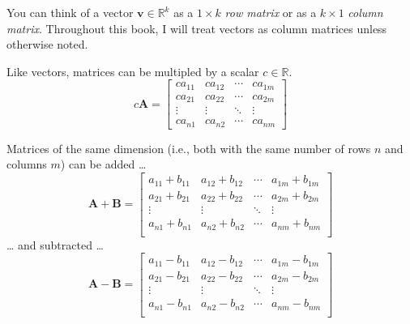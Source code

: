 \documentclass[12pt,oneside,openany]{book}
\begin{document}
You can think of a vector \(\mathbf{v} \in \mathbb{R}^k\) as a
\(1 \times k\) \emph{row matrix} or as a \(k \times 1\) \emph{column
matrix}. Throughout this book, I will treat vectors as column matrices
unless otherwise noted.

Like vectors, matrices can be multipled by a scalar
\(c \in \mathbb{R}\). \[
c \mathbf{A} =
\begin{bmatrix}
  c a_{11} & c a_{12} & \cdots & c a_{1m} \\
  c a_{21} & c a_{22} & \cdots & c a_{2m} \\
  \vdots & \vdots & \ddots & \vdots \\
  c a_{n1} & c a_{n2} & \cdots & c a_{nm}
\end{bmatrix}
\]

Matrices of the same dimension (i.e., both with the same number of rows
\(n\) and columns \(m\)) can be added \ldots{} \[
\mathbf{A} + \mathbf{B} =
\begin{bmatrix}
  a_{11} + b_{11} & a_{12} + b_{12} & \cdots & a_{1m} + b_{1m} \\
  a_{21} + b_{21} & a_{22} + b_{22} & \cdots & a_{2m} + b_{2m} \\
  \vdots & \vdots & \ddots & \vdots \\
  a_{n1} + b_{n1} & a_{n2} + b_{n2} & \cdots & a_{nm} + b_{nm} \\
\end{bmatrix}
\] \ldots{} and subtracted \ldots{} \[
\mathbf{A} - \mathbf{B} =
\begin{bmatrix}
  a_{11} - b_{11} & a_{12} - b_{12} & \cdots & a_{1m} - b_{1m} \\
  a_{21} - b_{21} & a_{22} - b_{22} & \cdots & a_{2m} - b_{2m} \\
  \vdots & \vdots & \ddots & \vdots \\
  a_{n1} - b_{n1} & a_{n2} - b_{n2} & \cdots & a_{nm} - b_{nm} \\
\end{bmatrix}
\]
\end{document}
